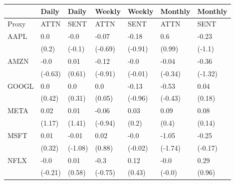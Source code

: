 \begin{tabular}{lllllll}
\toprule
{} &    Daily &    Daily &   Weekly &   Weekly &  Monthly &  Monthly \\
\midrule
Proxy &     ATTN &     SENT &     ATTN &     SENT &     ATTN &     SENT \\
AAPL  &      0.0 &     -0.0 &    -0.07 &    -0.18 &      0.6 &    -0.23 \\
      &    (0.2) &   (-0.1) &  (-0.69) &  (-0.91) &   (0.99) &   (-1.1) \\
AMZN  &     -0.0 &     0.01 &    -0.12 &     -0.0 &    -0.04 &    -0.36 \\
      &  (-0.63) &   (0.61) &  (-0.91) &  (-0.01) &  (-0.34) &  (-1.32) \\
GOOGL &      0.0 &      0.0 &      0.0 &    -0.13 &    -0.53 &     0.04 \\
      &   (0.42) &   (0.31) &   (0.05) &  (-0.96) &  (-0.43) &   (0.18) \\
META  &     0.02 &     0.01 &    -0.06 &     0.03 &     0.09 &     0.08 \\
      &   (1.17) &   (1.41) &  (-0.94) &    (0.2) &    (0.4) &   (0.14) \\
MSFT  &     0.01 &    -0.01 &     0.02 &     -0.0 &    -1.05 &    -0.25 \\
      &   (0.32) &  (-1.08) &   (0.88) &  (-0.02) &  (-1.74) &  (-0.17) \\
NFLX  &     -0.0 &     0.01 &     -0.3 &     0.12 &     -0.0 &     0.29 \\
      &  (-0.21) &   (0.58) &  (-0.75) &   (0.43) &   (-0.0) &   (0.96) \\
\bottomrule
\end{tabular}
